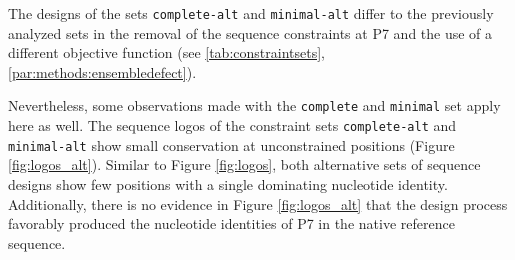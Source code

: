 \documentclass[../../master.tex]{subfiles}
\begin{document}

The designs of the sets \texttt{complete-alt} and \texttt{minimal-alt} differ to the previously analyzed sets in the removal of the sequence constraints at P7 and the use of a different objective function (see \autoref{tab:constraintsets}, \autoref{par:methods:ensembledefect}).

Nevertheless, some observations made with the \texttt{complete} and \texttt{minimal} set apply here as well.
The sequence logos of the constraint sets \texttt{complete-alt} and \texttt{minimal-alt} show small conservation at unconstrained positions (Figure \ref{fig:logos_alt}).
Similar to Figure \ref{fig:logos}, both alternative sets of sequence designs show few positions with a single dominating nucleotide identity.
Additionally, there is no evidence in Figure \ref{fig:logos_alt} that the design process favorably produced the nucleotide identities of P7 in the native reference sequence.
\end{document}
